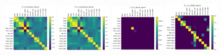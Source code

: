 \begin{figure}
    \centering
    \includegraphics[width=0.24\textwidth]{chap6/figs/T1_2.0_Pearson_Result.png}
    \includegraphics[width=0.24\textwidth]{chap6/figs/T1_2.0_Spearman_Result.png}
    \includegraphics[width=0.24\textwidth]{chap6/figs/T1_2.0_Glasso_Result.png}
    \includegraphics[width=0.24\textwidth]{chap6/figs/T1_2.0_CODEC_Result.png}
    

\end{figure}
